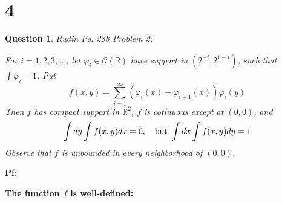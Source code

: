 \documentclass{article}
\newtheorem{question}{Question}
\begin{document}
\break

\section*{4}
\begin{myBox}[]{}
    \begin{question}
        Rudin Pg. 288 Problem 2:

        For $i=1,2,3,...$, let $\varphi_i\in \mathcal{C}(\mathbb{R})$ have support in $(2^{-i},2^{1-i})$, such that $\int\varphi_i=1$. Put 
        $$f(x,y)=\sum_{i=1}^{\infty}(\varphi_i(x)-\varphi_{i+1}(x))\varphi_i(y)$$
        Then $f$ has compact support in $\mathbb{R}^2$, $f$ is cotinuous except at $(0,0)$, and 
        $$\int dy\int f(x,y)dx = 0,\quad \textmd{but } \int dx\int f(x,y)dy = 1$$
        Observe that $f$ is unbounded in every neighborhood of $(0,0)$.
    \end{question}
\end{myBox}

\textbf{Pf:}

\textbf{The function $f$ is well-defined:}
\end{document}
